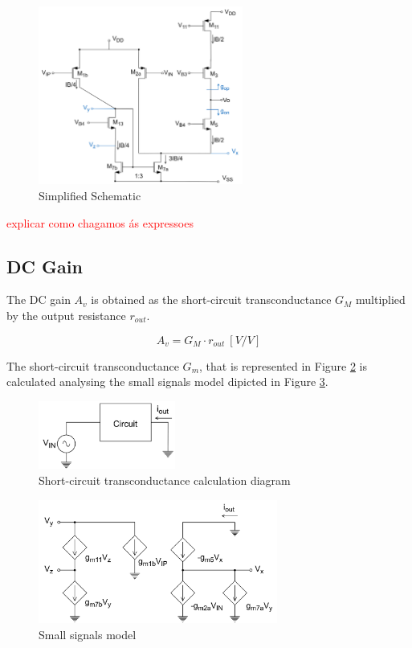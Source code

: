 \begin{figure}[H]
    \centering
    \includegraphics[width=0.6\textwidth]{Images/simplified_sch.png}
    \caption{Simplified Schematic}
    \label{fig:simplified_schematic}
\end{figure}



\textcolor{red}{explicar como chagamos ás expressoes}
\subsection {DC Gain}

The DC gain $A_v$ is obtained as the short-circuit transconductance $G_M$ multiplied by the output resistance $r_{out}$.

$$A_v = G_M \cdot r_{out}\ [V/V]$$

The short-circuit transconductance $G_m$, that is represented in Figure \ref{fig:cc_transconductance} is calculated analysing the small signals model dipicted in Figure \ref{fig:small_signals}.

\begin{figure}[H]
    \centering
    \includegraphics[width=0.4\textwidth]{Images/cc_transconductance.png}
    \caption{Short-circuit transconductance calculation diagram}
    \label{fig:cc_transconductance}
\end{figure}

\begin{figure}[H]
    \centering
    \includegraphics[width=0.7\textwidth]{Images/small_signals.png}
    \caption{Small signals model}
    \label{fig:small_signals}
\end{figure}

